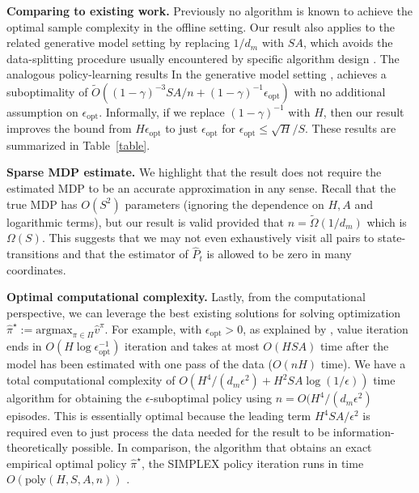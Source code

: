 \noindent\textbf{Comparing to existing work.} Previously no algorithm is known to achieve the optimal sample complexity in the offline setting. Our result also applies to the related generative model setting by replacing $1/d_m$ with $SA$, which avoids the data-splitting procedure usually encountered by specific algorithm design \citep[e.g.,][]{sidford2018near}. 
The analogous policy-learning results In the generative model setting \citep[Theorem 1]{agarwal2020model} , 
 achieves a suboptimality of $\tilde{O}(  (1-\gamma)^{-3}SA/n + (1-\gamma)^{-1} \epsilon_{\text{opt}}  )$ with no additional assumption on $ \epsilon_{\text{opt}}$. Informally, if we replace $(1-\gamma)^{-1}$ with $H$, then our result improves the bound from $H \epsilon_{\text{opt}}$ to just $\epsilon_{\text{opt}}$ for $\epsilon_{\text{opt}}\leq \sqrt{H}/S$. 
  These results are summarized in Table~\ref{table}. 
  
  \noindent\textbf{Sparse MDP estimate.}
  We highlight that the result does not require the estimated MDP to be an accurate approximation in any sense. Recall that the true MDP has $O(S^2)$ parameters (ignoring the dependence on $H,A$ and logarithmic terms), but our result is valid provided that  $n = \tilde{\Omega}(1/d_m)$ which is $\Omega(S)$. This suggests that we may not even exhaustively visit all pairs to state-transitions and that the estimator of $\hat{P}_t$ is allowed to be zero in many coordinates.
  
  
  \noindent\textbf{Optimal computational complexity.}
  Lastly, from the computational perspective, we can leverage the best existing solutions for solving optimization $\widehat{\pi}^\star:=\text{argmax}_{\pi\in\Pi} \widehat{v}^\pi$. For example, with $\epsilon_{\text{opt}}>0$, as explained by \citet{agarwal2020model}, value iteration ends in $O(H\log \epsilon_{\text{opt}}^{-1})$ iteration 
  and takes at most $O(HSA)$ time after the model has been estimated with one pass of the data ($O(nH)$ time). We have a total computational complexity of $O(H^4/(d_m \epsilon^2) + H^2SA\log(1/\epsilon))$ time algorithm for obtaining the $\epsilon$-suboptimal policy using $n=O(H^4/(d_m \epsilon^2) $ episodes. This is essentially optimal because the leading term $H^4SA/\epsilon^2$ is required even to just process the data needed for the result to be information-theoretically possible. In comparison, the algorithm that obtains an exact empirical optimal policy $\widehat{\pi}^\star$, the SIMPLEX policy iteration runs in time $O(\text{poly}(H,S,A,n))$ \citep{ye2011simplex}. 
 





